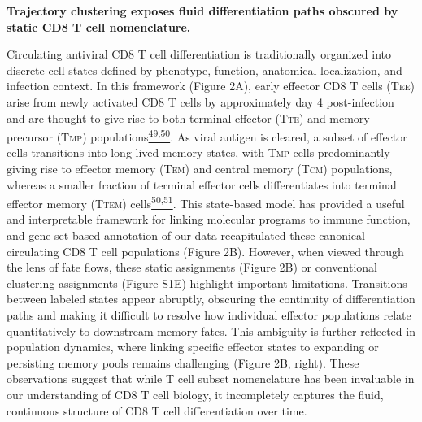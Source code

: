 \textbf{Trajectory clustering exposes fluid differentiation paths
obscured by static CD8 T cell nomenclature.}

Circulating antiviral CD8 T cell differentiation is traditionally
organized into discrete cell states defined by phenotype, function,
anatomical localization, and infection context. In this framework
(Figure 2A), early effector CD8 T cells (T\textsc{ee}) arise from newly
activated CD8 T cells by approximately day 4 post-infection and are
thought to give rise to both terminal effector (T\textsc{te}) and memory
precursor (T\textsc{mp})
populations\href{https://sciwheel.com/work/citation?ids=11131663,9725107\&pre=\&pre=\&suf=\&suf=\&sa=0,0\&dbf=0\&dbf=0}{\textsuperscript{49,50}}.
As viral antigen is cleared, a subset of effector cells transitions into
long-lived memory states, with T\textsc{mp} cells predominantly giving
rise to effector memory (T\textsc{em}) and central memory (T\textsc{cm})
populations, whereas a smaller fraction of terminal effector cells
differentiates into terminal effector memory (T\textsc{tem})
cells\href{https://sciwheel.com/work/citation?ids=9725107,9493658\&pre=\&pre=\&suf=\&suf=\&sa=0,0\&dbf=0\&dbf=0}{\textsuperscript{50,51}}.
This state-based model has provided a useful and interpretable framework
for linking molecular programs to immune function, and gene set-based
annotation of our data recapitulated these canonical circulating CD8 T
cell populations (Figure 2B). However, when viewed through the lens of
fate flows, these static assignments (Figure 2B) or conventional
clustering assignments (Figure S1E) highlight important limitations.
Transitions between labeled states appear abruptly, obscuring the
continuity of differentiation paths and making it difficult to resolve
how individual effector populations relate quantitatively to downstream
memory fates. This ambiguity is further reflected in population
dynamics, where linking specific effector states to expanding or
persisting memory pools remains challenging (Figure 2B, right). These
observations suggest that while T cell subset nomenclature has been
invaluable in our understanding of CD8 T cell biology, it incompletely
captures the fluid, continuous structure of CD8 T cell differentiation
over time.

